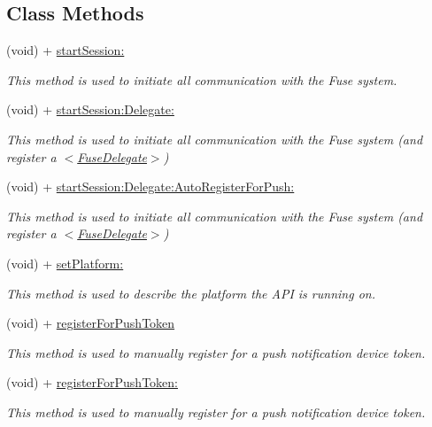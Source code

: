 \subsection*{Class Methods}
\begin{DoxyCompactItemize}
\item 
(void) + \hyperlink{interface_fuse_a_p_i_ab8c3327287bfed0a8a9c74e6664d7717}{start\+Session\+:}
\begin{DoxyCompactList}\small\item\em This method is used to initiate all communication with the Fuse system. \end{DoxyCompactList}\item 
(void) + \hyperlink{interface_fuse_a_p_i_aab1649c81002a336ca872da6fef36b8d}{start\+Session\+:\+Delegate\+:}
\begin{DoxyCompactList}\small\item\em This method is used to initiate all communication with the Fuse system (and register a $<$\hyperlink{protocol_fuse_delegate-p}{Fuse\+Delegate}$>$) \end{DoxyCompactList}\item 
(void) + \hyperlink{interface_fuse_a_p_i_aa08196a04aa0f91f8967e2f0cd9b5f6e}{start\+Session\+:\+Delegate\+:\+Auto\+Register\+For\+Push\+:}
\begin{DoxyCompactList}\small\item\em This method is used to initiate all communication with the Fuse system (and register a $<$\hyperlink{protocol_fuse_delegate-p}{Fuse\+Delegate}$>$) \end{DoxyCompactList}\item 
(void) + \hyperlink{interface_fuse_a_p_i_a4400b7bb4b8e108c38405c47eba69b5c}{set\+Platform\+:}
\begin{DoxyCompactList}\small\item\em This method is used to describe the platform the A\+P\+I is running on. \end{DoxyCompactList}\item 
(void) + \hyperlink{interface_fuse_a_p_i_aea1b9766935aafaeb49889dc6f7cca93}{register\+For\+Push\+Token}
\begin{DoxyCompactList}\small\item\em This method is used to manually register for a push notification device token. \end{DoxyCompactList}\item 
(void) + \hyperlink{interface_fuse_a_p_i_a774f0872e0eb00528391cdc376876446}{register\+For\+Push\+Token\+:}
\begin{DoxyCompactList}\small\item\em This method is used to manually register for a push notification device token. \end{DoxyCompactList}\item 

\end{DoxyCompactItemize}

